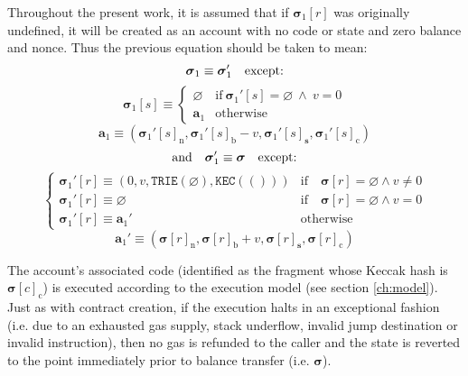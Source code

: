 \documentclass[9pt,oneside]{amsart}
\begin{document}
\begin{multicols}{2}
Throughout the present work, it is assumed that if $\boldsymbol{\sigma}_1[r]$ was originally undefined, it will be created as an account with no code or state and zero balance and nonce. Thus the previous equation should be taken to mean:
\begin{equation}
\boldsymbol{\sigma}_1 \equiv \boldsymbol{\sigma}_1' \quad \text{except:} \\
\end{equation}
\begin{equation}
\boldsymbol{\sigma}_1[s] \equiv \begin{cases}
\varnothing & \text{if}\ \boldsymbol{\sigma}_1'[s] = \varnothing \ \wedge\ v = 0 \\
\mathbf{a}_1 &\text{otherwise}
\end{cases}
\end{equation}
\begin{equation}
\mathbf{a}_1 \equiv \left(\boldsymbol{\sigma}_1'[s]_{\mathrm{n}}, \boldsymbol{\sigma}_1'[s]_{\mathrm{b}} - v, \boldsymbol{\sigma}_1'[s]_{\mathbf{s}}, \boldsymbol{\sigma}_1'[s]_{\mathrm{c}}\right)
\end{equation}
\begin{equation}
\text{and}\quad \boldsymbol{\sigma}_1' \equiv \boldsymbol{\sigma} \quad \text{except:} \\
\end{equation}
\begin{equation}
\begin{cases}
\boldsymbol{\sigma}_1'[r] \equiv (0, v, \mathtt{TRIE}(\varnothing), \mathtt{KEC}(())) & \text{if} \quad \boldsymbol{\sigma}[r] = \varnothing \wedge v \neq 0 \\
\boldsymbol{\sigma}_1'[r] \equiv \varnothing & \text{if}\quad \boldsymbol{\sigma}[r] = \varnothing \wedge v = 0 \\
\boldsymbol{\sigma}_1'[r] \equiv \mathbf{a}_1' & \text{otherwise}
\end{cases}
\end{equation}
\begin{equation}
\mathbf{a}_1' \equiv (\boldsymbol{\sigma}[r]_{\mathrm{n}}, \boldsymbol{\sigma}[r]_{\mathrm{b}} + v, \boldsymbol{\sigma}[r]_{\mathbf{s}}, \boldsymbol{\sigma}[r]_{\mathrm{c}})
\end{equation}

The account's associated code (identified as the fragment whose Keccak hash is $\boldsymbol{\sigma}[c]_{\mathrm{c}}$) is executed according to the execution model (see section \ref{ch:model}). Just as with contract creation, if the execution halts in an exceptional fashion (i.e. due to an exhausted gas supply, stack underflow, invalid jump destination or invalid instruction), then no gas is refunded to the caller and the state is reverted to the point immediately prior to balance transfer (i.e. $\boldsymbol{\sigma}$).


\end{multicols}
\end{document}
